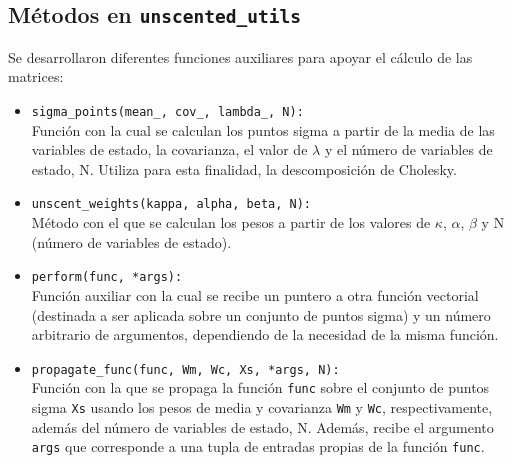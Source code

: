 \begin{appendix}
\section{M\'etodos en \texttt{unscented\_utils}}
\label{ap:unsutils}
Se desarrollaron diferentes funciones auxiliares para apoyar el c\'alculo de las matrices:
\begin{itemize}
\item \texttt{sigma\_points(mean\_, cov\_, lambda\_, N):}\\
Funci\'on con la cual se calculan los puntos sigma a partir de la media de las variables de estado, la covarianza, el valor de $\lambda$ y el n\'umero de variables de estado, N. Utiliza para esta finalidad, la descomposici\'on de Cholesky.
\item \texttt{unscent\_weights(kappa, alpha, beta, N):}\\
M\'etodo con el que se calculan los pesos a partir de los valores de $\kappa$, $\alpha$, $\beta$ y N (n\'umero de variables de estado). 
\item \texttt{perform(func, *args):}\\
Funci\'on auxiliar con la cual se recibe un puntero a otra funci\'on vectorial (destinada a ser aplicada sobre un conjunto de puntos sigma) y un n\'umero arbitrario de argumentos, dependiendo de la necesidad de la misma funci\'on.
\item \texttt{propagate\_func(func, Wm, Wc, Xs, *args, N):}\\
Funci\'on con la que se propaga la funci\'on \texttt{func} sobre el conjunto de puntos sigma \texttt{Xs} usando los pesos de media y covarianza \texttt{Wm} y \texttt{Wc}, respectivamente, adem\'as del n\'umero de variables de estado, N. Adem\'as, recibe el argumento \texttt{args} que corresponde a una tupla de entradas propias de la funci\'on \texttt{func}. 
\end{itemize}
\pagebreak


\end{appendix}
